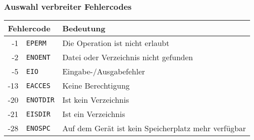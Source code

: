 \begin{frame}
  \frametitle{Auswahl verbreiter Fehlercodes}

  \bigskip\centering
  \begin{tabular}{|r@{~~}l|l|}
    \hline
    \multicolumn{2}{|l|}{\textbf{Fehlercode}}        & \textbf{Bedeutung} \\
    \hline
    -1      & \texttt{EPERM}     & Die Operation ist nicht erlaubt \\
    -2      & \texttt{ENOENT}    & Datei oder Verzeichnis nicht gefunden \\
    -5      & \texttt{EIO}       & Eingabe-/Ausgabefehler \\
    -13     & \texttt{EACCES}    & Keine Berechtigung \\
    -20     & \texttt{ENOTDIR}   & Ist kein Verzeichnis \\
    -21     & \texttt{EISDIR}    & Ist ein Verzeichnis \\
    -28     & \texttt{ENOSPC}    & Auf dem Gerät ist kein Speicherplatz mehr verfügbar \\
    \hline
  \end{tabular}


\end{frame}

